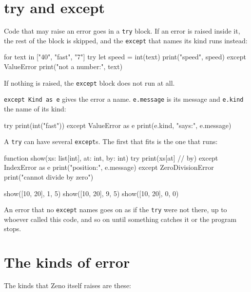 \section{try and except}

Code that may raise an error goes in a \verb|try| block. If an error
is raised inside it, the rest of the block is skipped, and the
\verb|except| that names its kind runs instead:

\begin{zeno}
for text in ["40", "fast", "7"] {
    try {
        let speed = int(text)
        print("speed", speed)
    } except ValueError {
        print("not a number:", text)
    }
}
\end{zeno}

If nothing is raised, the \verb|except| block does not run at all.

\verb|except Kind as e| gives the error a name. \verb|e.message| is
its message and \verb|e.kind| the name of its kind:

\begin{zeno}
try {
    print(int("fast"))
} except ValueError as e {
    print(e.kind, "says:", e.message)
}
\end{zeno}

A \verb|try| can have several \verb|except|s. The first that fits is
the one that runs:

\begin{zeno}
function show(xs: list[int], at: int, by: int) {
    try {
        print(xs[at] // by)
    } except IndexError as e {
        print("position:", e.message)
    } except ZeroDivisionError {
        print("cannot divide by zero")
    }
}

show([10, 20], 1, 5)
show([10, 20], 9, 5)
show([10, 20], 0, 0)
\end{zeno}

An error that no \verb|except| names goes on as if the \verb|try| were
not there, up to whoever called this code, and so on until something
catches it or the program stops.

\section{The kinds of error}

The kinds that Zeno itself raises are these:

